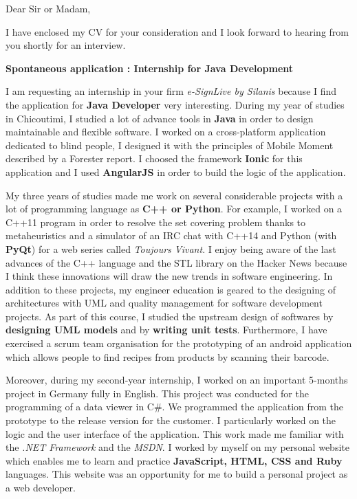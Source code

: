 \date{\today}
\opening{Dear Sir or Madam,}
\closing{I have enclosed my CV for your consideration and I look forward to hearing from you shortly for an interview.}

\makelettertitle

\textbf{Spontaneous application : Internship for Java Development}

\introduce{}
I am requesting an internship in your firm \textit{e-SignLive by Silanis} because I find the application for \textbf{Java Developer} very interesting. During my year of studies in Chicoutimi, I studied a lot of advance tools in \textbf{Java} in order to design maintainable and flexible software. I worked on a cross-platform application dedicated to blind people, I designed it with the principles of Mobile Moment described by a Forester report. I choosed the framework \textbf{Ionic} for this application and I used \textbf{AngularJS} in order to build the logic of the application.

My three years of studies made me work on several considerable projects with a lot of programming language as \textbf{C++ or Python}. For example, I worked on a C++11 program in order to resolve the set covering problem thanks to metaheuristics and a simulator of an IRC chat with C++14 and Python (with \textbf{PyQt}) for a web series called \textit{Toujours Vivant}. I enjoy being aware of the last advances of the C++ language and the STL library on the Hacker News because I think these innovations will draw the new trends in software engineering. In addition to these projects, my engineer education is geared to the designing of architectures with UML and quality management for software development projects. As part of this course, I studied the upstream design of softwares by \textbf{designing UML models} and by \textbf{writing unit tests}. Furthermore, I have exercised a scrum team organisation for the prototyping of an android application which allows people to find recipes from products by scanning their barcode.

Moreover, during my second-year internship, I worked on an important 5-months project in Germany fully in English. This project was conducted for the programming of a data viewer in C\#. We programmed the application from the prototype to the release version for the customer. I particularly worked on the logic and the user interface of the application. This work made me familiar with the \textit{.NET Framework} and the \textit{MSDN}. I worked by myself on my personal website which enables me to learn and practice \textbf{JavaScript, HTML, CSS and Ruby} languages. This website was an opportunity for me to build a personal project as a web developer. \conclude{}

\makeletterclosing
